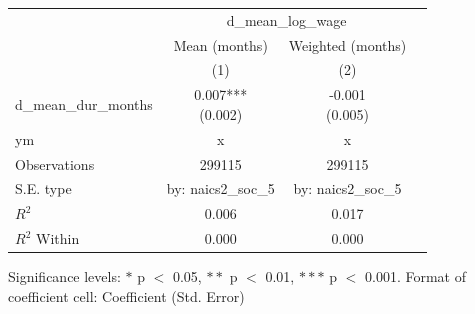 \renewcommand\cellalign{t}
\begin{threeparttable}
\begin{tabular}{lccc}
\toprule
 & \multicolumn{2}{c}{d_mean_log_wage} \\
\cmidrule(lr){2-3} 
 & Mean (months) & Weighted (months) \\
 & (1) & (2) \\
\midrule
\addlinespace
d_mean_dur_months & \makecell{0.007*** \\ (0.002)} & \makecell{-0.001 \\ (0.005)} \\
\midrule
\addlinespace
ym & x & x \\
\midrule
\addlinespace
Observations & 299115 & 299115 \\
S.E. type & by: naics2_soc_5 & by: naics2_soc_5 \\
$R^2$ & 0.006 & 0.017 \\
$R^2$ Within & 0.000 & 0.000 \\
\bottomrule
\end{tabular}
\footnotesize Significance levels: $*$ p $<$ 0.05, $**$ p $<$ 0.01, $***$ p $<$ 0.001. Format of coefficient cell: Coefficient 
 (Std. Error)
\end{threeparttable}